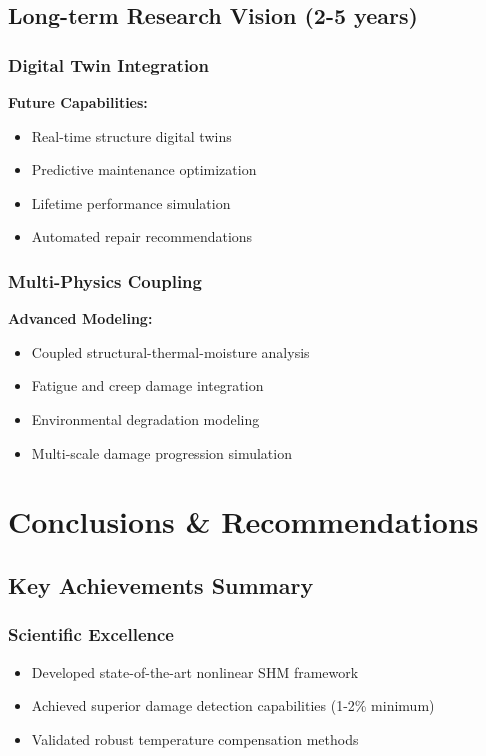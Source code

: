 \documentclass[12pt,a4paper]{article}
\begin{document}
\subsection{Long-term Research Vision (2-5 years)}

\subsubsection{Digital Twin Integration}

\textbf{Future Capabilities:}
\begin{itemize}
    \item Real-time structure digital twins
    \item Predictive maintenance optimization
    \item Lifetime performance simulation
    \item Automated repair recommendations
\end{itemize}

\subsubsection{Multi-Physics Coupling}

\textbf{Advanced Modeling:}
\begin{itemize}
    \item Coupled structural-thermal-moisture analysis
    \item Fatigue and creep damage integration
    \item Environmental degradation modeling
    \item Multi-scale damage progression simulation
\end{itemize}

\section{Conclusions \& Recommendations}

\subsection{Key Achievements Summary}

\subsubsection{Scientific Excellence}
\begin{itemize}
    \item Developed state-of-the-art nonlinear SHM framework
    \item Achieved superior damage detection capabilities (1-2\% minimum)
    \item Validated robust temperature compensation methods
\end{itemize}
\end{document}
